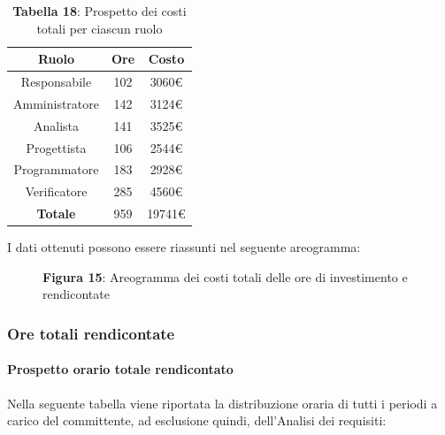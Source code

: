 \begin{table}[H]
	\centering
	\renewcommand{\arraystretch}{1.5}
	\begin{tabular}{|c|c|c|}
		\hline
		\rowcolor{lighter-grayer}
Ruolo & Ore & Costo \\ \hline
Responsabile & 102 & 3060\euro \\ \hline
Amministratore & 142 & 3124\euro \\ \hline
Analista & 141 & 3525\euro \\ \hline
Progettista & 106 & 2544\euro \\ \hline
Programmatore & 183 & 2928\euro \\ \hline
Verificatore & 285 & 4560\euro \\ \hline
\textbf{Totale} & 959 & 19741\euro \\ \hline
	\end{tabular}
	\caption*{\textbf{Tabella 18}: Prospetto dei costi totali per ciascun ruolo \\}
\end{table}

I dati ottenuti possono essere riassunti nel seguente areogramma:


\begin{figure}[H]
	\centering
	\caption*{\textbf{Figura 15}: Areogramma dei costi totali delle ore di investimento e rendicontate}
    \label{fig:Figura10}
\end{figure}

\subsubsection{Ore totali rendicontate}
\paragraph{Prospetto orario totale rendicontato}
Nella seguente tabella viene riportata la distribuzione oraria di tutti i periodi a carico del committente, ad esclusione quindi, dell'Analisi dei requisiti:

